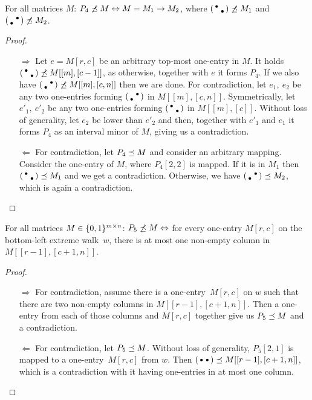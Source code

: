 \begin{prop}
For all matrices $M$: $P_4\not\preceq M\Leftrightarrow M=M_1\rightarrow M_2$, where $\left(\begin{smallmatrix}\bullet& \\ &\bullet\end{smallmatrix}\right)\not\preceq M_1$ and $\left(\begin{smallmatrix} &\bullet\\\bullet& \end{smallmatrix}\right)\not\preceq M_2$.
\end{prop}
\begin{proof}
\begin{itemize}
	\item[$\Rightarrow$] Let $e=M[r,c]$ be an arbitrary top-most one-entry in $M$. It holds $\left(\begin{smallmatrix}\bullet& \\ &\bullet\end{smallmatrix}\right)\not\preceq M[[m],[c-1]]$, as otherwise, together with $e$ it forms $P_4$. If we also have $\left(\begin{smallmatrix} &\bullet\\\bullet& \end{smallmatrix}\right)\not\preceq M[[m],[c,n]]$ then we are done. For contradiction, let $e_1,\ e_2$ be any two one-entries forming $\left(\begin{smallmatrix} &\bullet\\\bullet& \end{smallmatrix}\right)$ in $M[[m],[c,n]]$. Symmetrically, let $e'_1,\ e'_2$ be any two one-entries forming $\left(\begin{smallmatrix}\bullet& \\ &\bullet\end{smallmatrix}\right)$ in $M[[m],[c]]$. Without loss of generality, let $e_2$ be lower than $e'_2$ and then, together with $e'_1$ and $e_1$ it forms $P_4$ as an interval minor of $M$, giving us a contradiction. 
	\item[$\Leftarrow$] For contradiction, let $P_4\preceq M$ and consider an arbitrary mapping. Consider the one-entry of $M$, where $P_4[2,2]$ is mapped. If it is in $M_1$ then $\left(\begin{smallmatrix}\bullet& \\ &\bullet\end{smallmatrix}\right)\preceq M_1$ and we get a contradiction. Otherwise, we have $\left(\begin{smallmatrix} &\bullet\\\bullet& \end{smallmatrix}\right)\preceq M_2$, which is again a contradiction. \qedhere
\end{itemize}
\end{proof}

\begin{prop}
For all matrices $M\in\{0,1\}^{m\times n}$: $P_5\not\preceq M\Leftrightarrow$ for every one-entry $M[r,c]$ on the bottom-left extreme walk~$w$, there is at most one non-empty column in $M[[r-1],[c+1,n]]$.
\end{prop}
\begin{proof}
\begin{itemize}
	\item[$\Rightarrow$] For contradiction, assume there is a one-entry~$M[r,c]$ on $w$ such that there are two non-empty columns in $M[[r-1],[c+1,n]]$. Then a one-entry from each of those columns and $M[r,c]$ together give us $P_5\preceq M$ and a contradiction. 
	\item[$\Leftarrow$] For contradiction, let $P_5\preceq M$. Without loss of generality, $P_5[2,1]$ is mapped to a one-entry~$M[r,c]$ from $w$. Then $\left(\begin{smallmatrix}\bullet&\bullet\end{smallmatrix}\right)\preceq M[[r-1],[c+1,n]]$, which is a contradiction with it having one-entries in at most one column. \qedhere
\end{itemize}
\end{proof}

